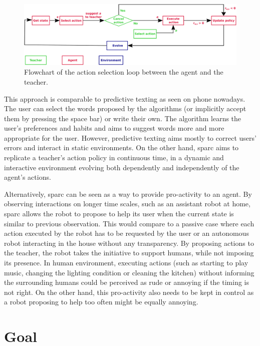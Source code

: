 \begin{figure}[ht]
	\includegraphics[width=1\linewidth]{flowchart.pdf}
	\centering
	\caption{Flowchart of the action selection loop between the agent and the teacher.}
	\label{fig:sparc_flowchart}
\end{figure}

This approach is comparable to predictive texting as seen on phone nowadays. The user can select the words proposed by the algorithms (or implicitly accept them by pressing the space bar) or write their own. The algorithm learns the user's preferences and habits and aims to suggest words more and more appropriate for the user. However, predictive texting aims mostly to correct users' errors and interact in static environments. On the other hand, \gls{sparc} aims to replicate a teacher's action policy in continuous time, in a dynamic and interactive environment evolving both dependently and independently of the agent's actions.

Alternatively, \gls{sparc} can be seen as a way to provide pro-activity to an agent. By observing interactions on longer time scales, such as an assistant robot at home, \gls{sparc} allows the robot to propose to help its user when the current state is similar to previous observation. This would compare to a passive case where each action executed by the robot has to be requested by the user or an autonomous robot interacting in the house without any transparency. By proposing actions to the teacher, the robot takes the initiative to support humans, while not imposing its presence. In human environment, executing actions (such as starting to play music, changing the lighting condition or cleaning the kitchen) without informing the surrounding humans could be perceived as rude or annoying if the timing is not right. On the other hand, this pro-activity also needs to be kept in control as a robot proposing to help too often might be equally annoying.

\section{Goal}

